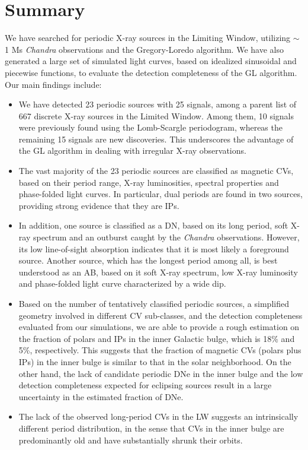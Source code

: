 \documentclass[fleqn,usenatbib]{mnras}
\begin{document}
\section{Summary}\label{sec:summary}
We have searched for periodic X-ray sources in the Limiting Window, utilizing $\sim$1 Ms {\it Chandra} observations and the Gregory-Loredo algorithm. We have also generated a large set of simulated light curves, based on idealized sinusoidal and piecewise functions, to evaluate the detection completeness of the GL algorithm. Our main findings include:

\begin{itemize}
\item We have detected 23 periodic sources with 25 signals, among a parent list of 667 discrete X-ray sources in the Limited Window. Among them, 10 signals were previously found \cite{2012ApJ...746..165H} using the Lomb-Scargle periodogram, whereas the remaining 15 signals are new discoveries. This underscores the advantage of the GL algorithm in dealing with irregular X-ray observations.

\item The vast majority of the 23 periodic sources are classified as magnetic CVs, based on their period range, X-ray luminosities, spectral properties and phase-folded light curves. In particular, dual periods are found in two sources, providing strong evidence that they are IPs. 

\item In addition, one source is classified as a DN, based on its long period, soft X-ray spectrum and an outburst caught by the {\it Chandra} observations. However, its low line-of-sight absorption indicates that it is most likely a foreground source. Another source, which has the longest period among all, is best understood as an AB, based on it soft X-ray spectrum, low X-ray luminosity and phase-folded light curve characterized by a wide dip. 

\item Based on the number of tentatively classified periodic sources, a simplified geometry involved in different CV sub-classes, and the detection completeness evaluated from our simulations, we are able to provide a rough estimation on the fraction of polars and IPs in the inner Galactic bulge, which is 18\% and 5\%, respectively. This suggests that the fraction of magnetic CVs (polars plus IPs) in the inner bulge is similar to that in the solar neighborhood. On the other hand, the lack of candidate periodic DNe in the inner bulge and the low detection completeness expected for eclipsing sources result in a large uncertainty in the estimated fraction of DNe. 
 
\item The lack of the observed long-period CVs in the LW suggests an intrinsically different period distribution, in the sense that CVs in the inner bulge are predominantly old and have substantially shrunk their orbits. 

\end{itemize}
\end{document}
